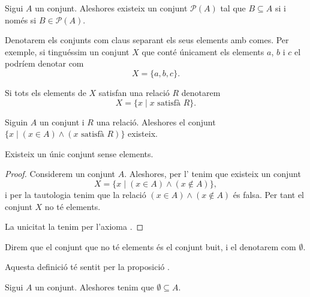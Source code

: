 \documentclass[../Apunts.tex]{subfiles}
\begin{document}
	\begin{axiom}
		\label{axiom:conjunt potència}
		Sigui \(A\) un conjunt. Aleshores existeix un conjunt \(\mathcal{P}(A)\) tal que \(B\subseteq A\) si i només si \(B\in\mathcal{P}(A)\).
	\end{axiom}
	\begin{notation}
		Denotarem els conjunts com claus separant els seus elements amb comes. Per exemple, si tinguéssim un conjunt \(X\) que conté únicament els elements \(a\), \(b\) i \(c\) el podríem denotar com
		\[X=\{a,b,c\}.\]
		
		Si tots els elements de \(X\) satisfan una relació \(R\) denotarem
		\[X=\{x\mid x\text{ satisfà }R\}.\]
	\end{notation}
	\begin{axiom}
		\label{axiom:axioma de separació}
		Siguin \(A\) un conjunt i \(R\) una relació. Aleshores el conjunt \(\{x\mid(x\in A)\land(x\text{ satisfà }R)\}\) existeix.
	\end{axiom}
	\begin{proposition}
		\label{prop:conjunt buit}
		Existeix un únic conjunt sense elements.
		\begin{proof}
			Considerem un conjunt \(A\). Aleshores, per l' tenim que existeix un conjunt
			\[X=\{x\mid(x\in A)\land(x\notin A)\},\]
			i per la tautologia  tenim que la relació \((x\in A)\land(x\notin A)\) és falsa. Per tant el conjunt \(X\) no té elements.
			
			La unicitat la tenim per l'axioma .
		\end{proof}
	\end{proposition}
	\begin{definition}
		Direm que el conjunt que no té elements és el conjunt buit, i el denotarem com \(\emptyset\).
		
		Aquesta definició té sentit per la proposició .
	\end{definition}
	\begin{axiom}
		\label{axiom:axioma de regularitat}
		Sigui \(A\) un conjunt. Aleshores tenim que \(\emptyset\subseteq A\).
	\end{axiom}
\end{document}
